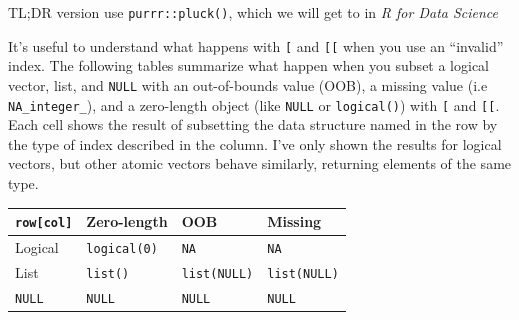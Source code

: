 \documentclass[]{book}
\newenvironment{Shaded}{\begin{snugshade}}{\end{snugshade}}
\newcommand{\CommentTok}[1]{\textcolor[rgb]{0.56,0.35,0.01}{\textit{#1}}}
\newcommand{\DataTypeTok}[1]{\textcolor[rgb]{0.13,0.29,0.53}{#1}}
\newcommand{\DecValTok}[1]{\textcolor[rgb]{0.00,0.00,0.81}{#1}}
\newcommand{\KeywordTok}[1]{\textcolor[rgb]{0.13,0.29,0.53}{\textbf{#1}}}
\newcommand{\NormalTok}[1]{#1}
\newcommand{\OperatorTok}[1]{\textcolor[rgb]{0.81,0.36,0.00}{\textbf{#1}}}
\newcommand{\OtherTok}[1]{\textcolor[rgb]{0.56,0.35,0.01}{#1}}
\newcommand{\StringTok}[1]{\textcolor[rgb]{0.31,0.60,0.02}{#1}}
\theoremstyle{definition}
\theoremstyle{definition}
\theoremstyle{definition}
\theoremstyle{remark}
\begin{document}
TL;DR version use \texttt{purrr::pluck()}, which we will get to in
\emph{R for Data Science}

It's useful to understand what happens with \texttt{{[}} and
\texttt{{[}{[}} when you use an ``invalid'' index. The following tables
summarize what happen when you subset a logical vector, list, and
\texttt{NULL} with an out-of-bounds value (OOB), a missing value (i.e
\texttt{NA\_integer\_}), and a zero-length object (like \texttt{NULL} or
\texttt{logical()}) with \texttt{{[}} and \texttt{{[}{[}}. Each cell
shows the result of subsetting the data structure named in the row by
the type of index described in the column. I've only shown the results
for logical vectors, but other atomic vectors behave similarly,
returning elements of the same type.

\begin{longtable}[]{@{}llll@{}}
\toprule
\texttt{row{[}col{]}} & Zero-length & OOB & Missing\tabularnewline
\midrule
\endhead
Logical & \texttt{logical(0)} & \texttt{NA} & \texttt{NA}\tabularnewline
List & \texttt{list()} & \texttt{list(NULL)} &
\texttt{list(NULL)}\tabularnewline
\texttt{NULL} & \texttt{NULL} & \texttt{NULL} &
\texttt{NULL}\tabularnewline
\bottomrule
\end{longtable}

\begin{Shaded}
\end{Shaded}
\end{document}
